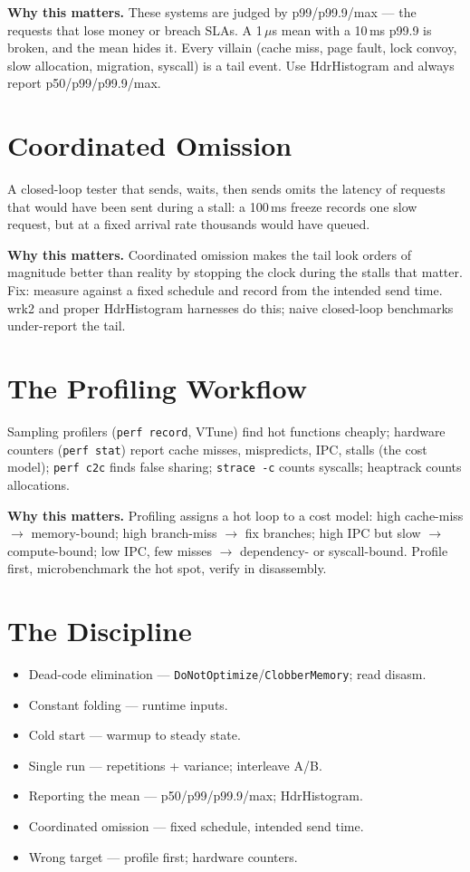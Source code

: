 \textbf{Why this matters.} These systems are judged by p99/p99.9/max --- the requests that lose money or breach SLAs. A 1\,$\mu$s mean with a 10\,ms p99.9 is broken, and the mean hides it. Every villain (cache miss, page fault, lock convoy, slow allocation, migration, syscall) is a tail event. Use HdrHistogram and always report p50/p99/p99.9/max.

\section{Coordinated Omission}
A closed-loop tester that sends, waits, then sends omits the latency of requests that would have been sent during a stall: a 100\,ms freeze records one slow request, but at a fixed arrival rate thousands would have queued.

\textbf{Why this matters.} Coordinated omission makes the tail look orders of magnitude better than reality by stopping the clock during the stalls that matter. Fix: measure against a fixed schedule and record from the intended send time. wrk2 and proper HdrHistogram harnesses do this; naive closed-loop benchmarks under-report the tail.

\section{The Profiling Workflow}
Sampling profilers (\texttt{perf record}, VTune) find hot functions cheaply; hardware counters (\texttt{perf stat}) report cache misses, mispredicts, IPC, stalls (the cost model); \texttt{perf c2c} finds false sharing; \texttt{strace -c} counts syscalls; heaptrack counts allocations.

\textbf{Why this matters.} Profiling assigns a hot loop to a cost model: high cache-miss $\to$ memory-bound; high branch-miss $\to$ fix branches; high IPC but slow $\to$ compute-bound; low IPC, few misses $\to$ dependency- or syscall-bound. Profile first, microbenchmark the hot spot, verify in disassembly.

\section{The Discipline}
\begin{itemize}
\item Dead-code elimination --- \texttt{DoNotOptimize}/\texttt{ClobberMemory}; read disasm.
\item Constant folding --- runtime inputs.
\item Cold start --- warmup to steady state.
\item Single run --- repetitions + variance; interleave A/B.
\item Reporting the mean --- p50/p99/p99.9/max; HdrHistogram.
\item Coordinated omission --- fixed schedule, intended send time.
\item Wrong target --- profile first; hardware counters.
\end{itemize}

